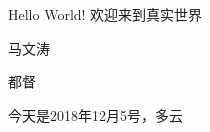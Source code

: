\documentclass{article}
\begin{document}
	\begin{CJK*}{UTF8}{gbsn}
		Hello World! 欢迎来到真实世界
		
   马文涛
   
   都督
   
   今天是2018年12月5号，多云
	\end{CJK*}
\end{document}
